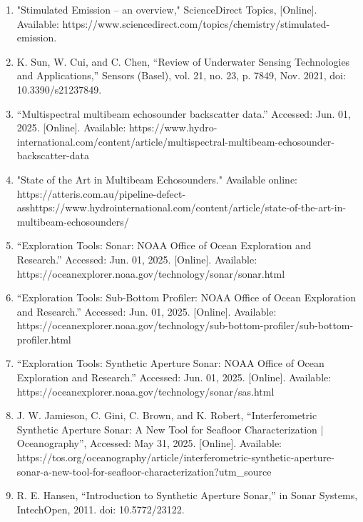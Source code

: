 \documentclass{article}
\begin{document}
\begin{enumerate}
    \item{"Stimulated Emission – an overview," ScienceDirect Topics, [Online]. Available: https://www.sciencedirect.com/topics/chemistry/stimulated-emission.}


    \item{K. Sun, W. Cui, and C. Chen, “Review of Underwater Sensing Technologies and Applications,” Sensors (Basel), vol. 21, no. 23, p. 7849, Nov. 2021, doi: 10.3390/s21237849.}

    \item{“Multispectral multibeam echosounder backscatter data.” Accessed: Jun. 01, 2025. [Online]. Available: https://www.hydro-international.com/content/article/multispectral-multibeam-echosounder-backscatter-data}


    \item{"State of the Art in Multibeam Echosounders." Available online: https://atteris.com.au/pipeline-defect-asshttps://www.hydrointernational.com/content/article/state-of-the-art-in-multibeam-echosounders/}


    \item{“Exploration Tools: Sonar: NOAA Office of Ocean Exploration and Research.” Accessed: Jun. 01, 2025. [Online]. Available: https://oceanexplorer.noaa.gov/technology/sonar/sonar.html}


    \item{“Exploration Tools: Sub-Bottom Profiler: NOAA Office of Ocean Exploration and Research.” Accessed: Jun. 01, 2025. [Online]. Available: https://oceanexplorer.noaa.gov/technology/sub-bottom-profiler/sub-bottom-profiler.html}


    \item{“Exploration Tools: Synthetic Aperture Sonar: NOAA Office of Ocean Exploration and Research.” Accessed: Jun. 01, 2025. [Online]. Available: https://oceanexplorer.noaa.gov/technology/sonar/sas.html}


    \item{J. W. Jamieson, C. Gini, C. Brown, and K. Robert, “Interferometric Synthetic Aperture Sonar: A New Tool for Seafloor Characterization | Oceanography”, Accessed: May 31, 2025. [Online]. Available: https://tos.org/oceanography/article/interferometric-synthetic-aperture-sonar-a-new-tool-for-seafloor-characterization?utm_source}


    \item{R. E. Hansen, “Introduction to Synthetic Aperture Sonar,” in Sonar Systems, IntechOpen, 2011. doi: 10.5772/23122.}


\end{enumerate}
\end{document}

